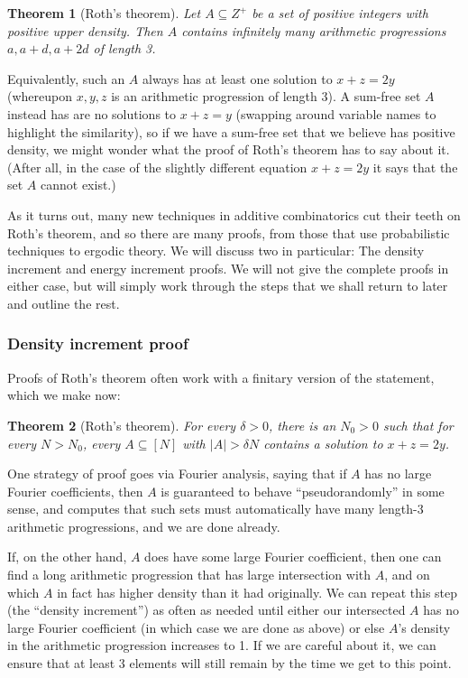 \documentclass{article}
\newtheorem{theorem}{Theorem}[section]
\theoremstyle{definition}
\theoremstyle{remark}
\numberwithin{equation}{section}
\begin{document}
\begin{theorem}[Roth's theorem]
  Let $A \subseteq Z^+$ be a set of positive integers with positive
  upper density.  Then $A$ contains infinitely many arithmetic
  progressions $a, a+d, a+2d$ of length 3.  
\end{theorem}

Equivalently, such an $A$ always has at least one solution to $x+z=2y$
(whereupon $x, y, z$ is an arithmetic progression of length $3$).  A
sum-free set $A$ instead has are no solutions to $x+z=y$ (swapping
around variable names to highlight the similarity), so if we have a
sum-free set that we believe has positive density, we might wonder
what the proof of Roth's theorem has to say about it.  (After all, in
the case of the slightly different equation $x+z=2y$ it says that the
set $A$ cannot exist.)

As it turns out, many new techniques in additive combinatorics cut
their teeth on Roth's theorem, and so there are many proofs, from
those that use probabilistic techniques to ergodic theory.  We will
discuss two in particular: The density increment and energy increment
proofs.  We will not give the complete proofs in either case, but will
simply work through the steps that we shall return to later and
outline the rest.

\subsubsection{Density increment proof}

Proofs of Roth's theorem often work with a finitary version of the
statement, which we make now:

\begin{theorem}[Roth's theorem]
  For every $\delta > 0$, there is an $N_0 > 0$ such that for every
  $N > N_0$, every $A \subseteq [N]$ with $|A| > \delta N$ contains a
  solution to $x+z=2y$.
\end{theorem}

One strategy of proof goes via Fourier analysis, saying that if $A$
has no large Fourier coefficients, then $A$ is guaranteed to behave
``pseudorandomly'' in some sense, and computes that such sets must
automatically have many length-3 arithmetic progressions, and we are
done already.  

If, on the other hand, $A$ does have some large Fourier coefficient,
then one can find a long arithmetic progression that has large
intersection with $A$, and on which $A$ in fact has higher density
than it had originally.  We can repeat this step (the ``density
increment'') as often as needed until either our intersected $A$ has
no large Fourier coefficient (in which case we are done as above) or
else $A$'s density in the arithmetic progression increases to 1.  If
we are careful about it, we can ensure that at least 3 elements will
still remain by the time we get to this point.
\end{document}

